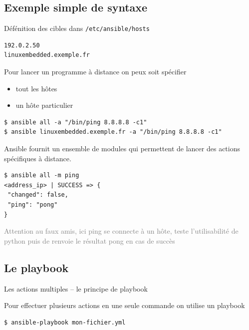 \documentclass[compress]{smilebeamer}
\begin{document}
\subsection{Exemple simple de syntaxe}

\begin{frame}[fragile]
Défénition des cibles dans \texttt{/etc/ansible/hosts}
\begin{lstlisting}
192.0.2.50
linuxembedded.exemple.fr
\end{lstlisting}
\end{frame}

\begin{frame}[fragile]
Pour lancer un programme à distance on peux soit spécifier
\begin{itemize}
	\item tout les hôtes
	\item un hôte particulier
\end{itemize}
\begin{lstlisting}[style=shell]
$ ansible all -a "/bin/ping 8.8.8.8 -c1"
$ ansible linuxembedded.exemple.fr -a "/bin/ping 8.8.8.8 -c1"
\end{lstlisting}
\end{frame}

\begin{frame}[fragile]
Ansible fournit un ensemble de modules qui permettent de lancer des actions spécifiques à distance.
\begin{lstlisting}[style=shell]
$ ansible all -m ping
<address_ip> | SUCCESS => {
 "changed": false, 
 "ping": "pong"
}
\end{lstlisting}
\textcolor{gray}{\tiny{Attention au faux amis, ici ping se connecte à un hôte, teste l’utilisabilité de python puis de renvoie le résultat pong en cas de succès}}
\end{frame}

\subsection{Le playbook}

\begin{frame}
\begin{center}
\textcolor{smileOrange}{\huge{Les actions multiples – le principe de playbook}}
\end{center}
\end{frame}

\begin{frame}[fragile]
Pour effectuer plusieurs actions en une seule commande on utilise un playbook
\begin{lstlisting}[style=shell]
$ ansible-playbook mon-fichier.yml
\end{lstlisting}
\end{frame}
\end{document}
